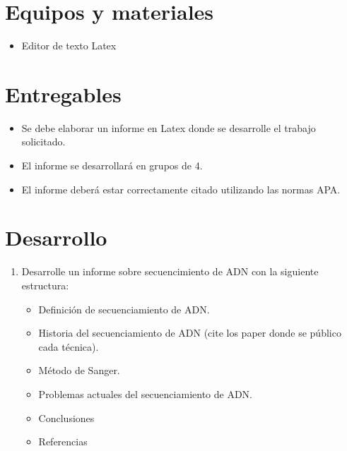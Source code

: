 \documentclass{article}
\begin{document}
	\section{Equipos y materiales}
	\begin{itemize}
		\item Editor de texto  Latex 
	\end{itemize}
	
	\section{Entregables}
	\begin{itemize}
		\item Se debe elaborar un informe en Latex donde se desarrolle el trabajo solicitado.
		\item El informe se desarrollará en grupos de 4.
		\item El informe deberá estar correctamente citado utilizando las normas APA.
	\end{itemize}
		
	
	
	\clearpage
	
	
	\section{Desarrollo}\label{sec:ejercicios}
	\begin{enumerate}
		\item Desarrolle un informe sobre secuencimiento de ADN con la siguiente estructura:
			\begin{itemize}
				\item Definición de secuenciamiento de ADN.
				\item Historia del secuenciamiento de ADN (cite los paper donde se público cada técnica).
				\item Método de Sanger.
				\item Problemas actuales del secuenciamiento de ADN.
				\item Conclusiones
				\item Referencias
			\end{itemize}
	
	\end{enumerate}
	
	
	
\end{document}
